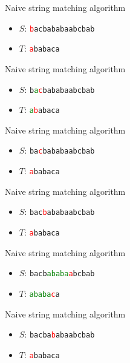 \documentclass{beamer}
\begin{document}
\begin{frame}[plain]{Naive string matching algorithm}
    \begin{itemize}
        \item $S$: \texttt{\textcolor{red}{b}acbababaabcbab}
        \item $T$: \phantom{\texttt{}}\texttt{\textcolor{red}{a}babaca}
    \end{itemize}
\end{frame}
\begin{frame}[plain]{Naive string matching algorithm}
    \begin{itemize}
        \item $S$: \texttt{b\textcolor{green}{a}\textcolor{red}{c}bababaabcbab}
        \item $T$: \texttt{\textcolor{green}{a}\textcolor{red}{b}abaca}
    \end{itemize}
\end{frame}
\begin{frame}[plain]{Naive string matching algorithm}
    \begin{itemize}
        \item $S$: \texttt{ba\textcolor{red}{c}bababaabcbab}
        \item $T$: \texttt{\textcolor{red}{a}babaca}
    \end{itemize}
\end{frame}
\begin{frame}[plain]{Naive string matching algorithm}
    \begin{itemize}
        \item $S$: \texttt{bac\textcolor{red}{b}ababaabcbab}
        \item $T$: \texttt{\textcolor{red}{a}babaca}
    \end{itemize}
\end{frame}
\begin{frame}[plain]{Naive string matching algorithm}
    \begin{itemize}
        \item $S$: \texttt{bacb\textcolor{green}{ababa}\textcolor{red}{a}bcbab}
        \item $T$: \texttt{\textcolor{green}{ababa}\textcolor{red}{c}a}
    \end{itemize}
\end{frame}
\begin{frame}[plain]{Naive string matching algorithm}
    \begin{itemize}
        \item $S$: \texttt{bacba\textcolor{red}{b}abaabcbab}
        \item $T$: \texttt{\textcolor{red}{a}babaca}
    \end{itemize}
\end{frame}
\end{document}
